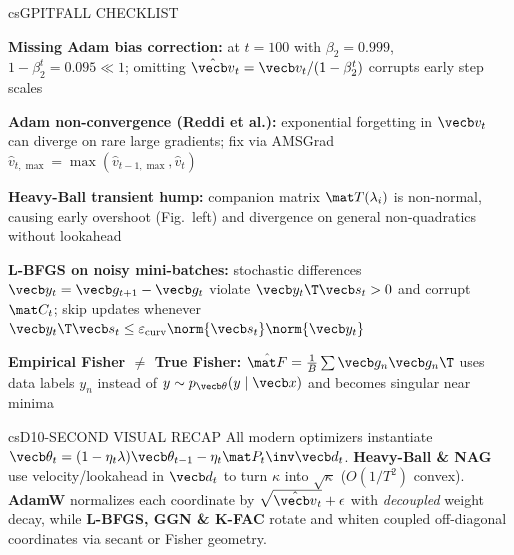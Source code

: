 \documentclass[../../../../master.tex]{subfiles}
\begin{document}
\begin{cscolumns}
\begin{cscard}{csG}{PITFALL CHECKLIST}
  \begin{csbul}
    \item \textbf{Missing Adam bias correction:} at $t=100$ with $\beta_2=0.999$, $1-\beta_2^t=0.095\ll 1$; omitting $\hat{\vecb v}_t=\vecb v_t/(1-\beta_2^t)$ corrupts early step scales
    \item \textbf{Adam non-convergence (Reddi et al.):} exponential forgetting in $\vecb v_t$ can diverge on rare large gradients; fix via AMSGrad $\hat v_{t,\max}=\max(\hat v_{t-1,\max},\hat v_t)$
    \item \textbf{Heavy-Ball transient hump:} companion matrix $\mat T(\lambda_i)$ is non-normal, causing early overshoot (Fig.\ left) and divergence on general non-quadratics without lookahead
    \item \textbf{L-BFGS on noisy mini-batches:} stochastic differences $\vecb y_t=\vecb g_{t+1}-\vecb g_t$ violate $\vecb y_t\T\vecb s_t>0$ and corrupt $\mat C_t$; skip updates whenever $\vecb y_t\T\vecb s_t\le\varepsilon_{\mathrm{curv}}\norm{\vecb s_t}\norm{\vecb y_t}$
    \item \textbf{Empirical Fisher $\neq$ True Fisher:} $\hat{\mat F}=\frac{1}{B}\sum\vecb g_n\vecb g_n\T$ uses data labels $y_n$ instead of $y\sim p_{\vecb\theta}(y\mid\vecb x)$ and becomes singular near minima
  \end{csbul}
\end{cscard}

\begin{cscard}{csD}{10-SECOND VISUAL RECAP}
  \sffamily\footnotesize
  All modern optimizers instantiate $\vecb\theta_t=(1-\eta_t\lambda)\vecb\theta_{t-1}-\eta_t\mat P_t\inv\vecb d_t$.
  \textbf{Heavy-Ball \& NAG} use velocity/lookahead in $\vecb d_t$ to turn $\kappa$ into $\sqrt\kappa$ ($O(1/T^2)$ convex).
  \textbf{AdamW} normalizes each coordinate by $\sqrt{\hat{\vecb v}_t}+\epsilon$ with \emph{decoupled} weight decay, while \textbf{L-BFGS, GGN \& K-FAC} rotate and whiten coupled off-diagonal coordinates via secant or Fisher geometry.
\end{cscard}
\end{cscolumns}

\csend
\end{document}
